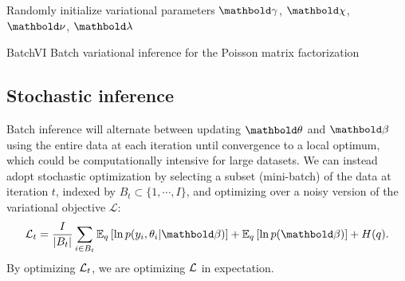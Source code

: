 \begin{algorithm}
\DontPrintSemicolon %
Randomly initialize variational parameters $\mb\gamma$, $\mb\chi$, $\mb\nu$, $\mb\lambda$\;
\Return{$\mb\gamma$, $\mb\chi$, $\mb\nu$, $\mb\lambda$}\;
\caption{{\sc BatchVI} Batch variational inference for the Poisson matrix factorization}
\label{chpt:tagging:algo:batch_vi}
\end{algorithm}

\subsection{Stochastic inference}\label{chpt:tagging:sec:svi}

Batch inference will alternate between updating $\mb{\theta}$ and $\mb{\beta}$ using the entire data at each iteration until convergence to a local optimum, which could be computationally intensive for large datasets. We can instead adopt stochastic optimization by selecting a subset (mini-batch) of the data at iteration $t$, indexed by $B_t \subset \{1, \cdots, I\}$, and optimizing over a noisy version of the variational objective $\mathcal{L}$:
\begin{equation}\label{chpt:tagging:eq:noisy_obj}
\cL_t = \frac{I}{|B_t|}\sum_{i \in B_t} \EE{q}{\ln p(y_i , \theta_i | \mb{\beta})}  + \EE{q}{\ln p(\mb{\beta})} + H(q).
\end{equation}
By optimizing $\mathcal{L}_t$, we are optimizing $\mathcal{L}$ in expectation. 

